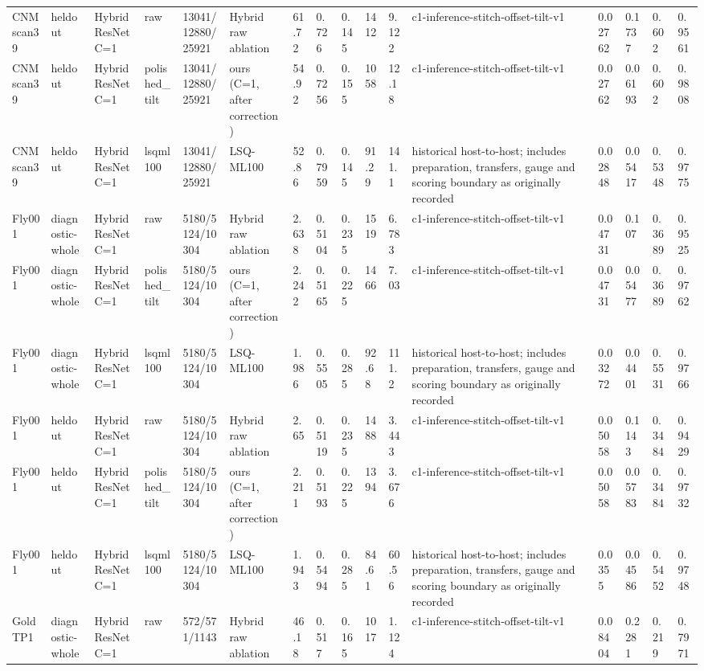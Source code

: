 \begin{tabular}{llllllllllllllll}
CNM scan39 & heldout & Hybrid ResNet C=1 & raw & 13041/12880/25921 & Hybrid raw ablation & 61.72 & 0.726 & 0.145 & 1412 & 9.122 & c1-inference-stitch-offset-tilt-v1 & 0.02762 & 0.1737 & 0.602 & 0.9561 \\
CNM scan39 & heldout & Hybrid ResNet C=1 & polished\_tilt & 13041/12880/25921 & ours (C=1, after correction) & 54.92 & 0.7256 & 0.155 & 1058 & 12.18 & c1-inference-stitch-offset-tilt-v1 & 0.02762 & 0.06193 & 0.602 & 0.9808 \\
CNM scan39 & heldout & Hybrid ResNet C=1 & lsqml100 & 13041/12880/25921 & LSQ-ML100 & 52.86 & 0.7959 & 0.145 & 91.29 & 141.1 & historical host-to-host; includes preparation, transfers, gauge and scoring boundary as originally recorded & 0.02848 & 0.05417 & 0.5348 & 0.9775 \\
Fly001 & diagnostic-whole & Hybrid ResNet C=1 & raw & 5180/5124/10304 & Hybrid raw ablation & 2.638 & 0.5104 & 0.235 & 1519 & 6.783 & c1-inference-stitch-offset-tilt-v1 & 0.04731 & 0.107 & 0.3689 & 0.9525 \\
Fly001 & diagnostic-whole & Hybrid ResNet C=1 & polished\_tilt & 5180/5124/10304 & ours (C=1, after correction) & 2.242 & 0.5165 & 0.225 & 1466 & 7.03 & c1-inference-stitch-offset-tilt-v1 & 0.04731 & 0.05477 & 0.3689 & 0.9762 \\
Fly001 & diagnostic-whole & Hybrid ResNet C=1 & lsqml100 & 5180/5124/10304 & LSQ-ML100 & 1.986 & 0.5505 & 0.285 & 92.68 & 111.2 & historical host-to-host; includes preparation, transfers, gauge and scoring boundary as originally recorded & 0.03272 & 0.04401 & 0.5531 & 0.9766 \\
Fly001 & heldout & Hybrid ResNet C=1 & raw & 5180/5124/10304 & Hybrid raw ablation & 2.65 & 0.5119 & 0.235 & 1488 & 3.443 & c1-inference-stitch-offset-tilt-v1 & 0.05058 & 0.1143 & 0.3484 & 0.9429 \\
Fly001 & heldout & Hybrid ResNet C=1 & polished\_tilt & 5180/5124/10304 & ours (C=1, after correction) & 2.211 & 0.5193 & 0.225 & 1394 & 3.676 & c1-inference-stitch-offset-tilt-v1 & 0.05058 & 0.05783 & 0.3484 & 0.9732 \\
Fly001 & heldout & Hybrid ResNet C=1 & lsqml100 & 5180/5124/10304 & LSQ-ML100 & 1.943 & 0.5494 & 0.285 & 84.61 & 60.56 & historical host-to-host; includes preparation, transfers, gauge and scoring boundary as originally recorded & 0.0355 & 0.04586 & 0.5452 & 0.9748 \\
Gold TP1 & diagnostic-whole & Hybrid ResNet C=1 & raw & 572/571/1143 & Hybrid raw ablation & 46.18 & 0.517 & 0.165 & 1017 & 1.124 & c1-inference-stitch-offset-tilt-v1 & 0.08404 & 0.2281 & 0.219 & 0.7971 \\

\end{tabular}
